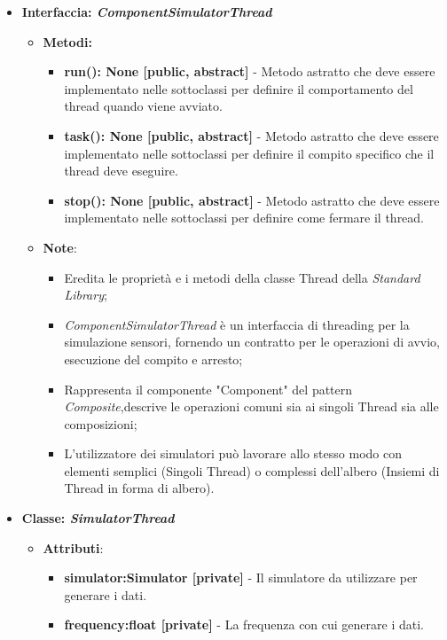 \begin{itemize}
\begin{itemize}
 \item{\textbf{Interfaccia: \textit{ComponentSimulatorThread}}}
    \begin{itemize}
        \item \textbf{Metodi: }
        \begin{itemize}
            \item \textbf{run(): None [public, abstract]} - Metodo astratto che deve essere implementato nelle sottoclassi per definire il comportamento del thread quando viene avviato.
            \item \textbf{task(): None [public, abstract]} - Metodo astratto che deve essere implementato nelle sottoclassi per definire il compito specifico che il thread deve eseguire.
            \item \textbf{stop(): None [public, abstract]} - Metodo astratto che deve essere implementato nelle sottoclassi per definire come fermare il thread.
        \end{itemize}
        \item\textbf{Note}:
            \begin{itemize}
                \item Eredita le proprietà e i metodi della classe Thread della \textit{Standard Library};
                \item \textit{ComponentSimulatorThread} è un interfaccia di threading per la simulazione sensori, fornendo un contratto per le operazioni di avvio, esecuzione del compito e arresto;
                \item Rappresenta il componente "Component" del pattern \textit{Composite},descrive le operazioni comuni sia ai singoli Thread sia alle composizioni;
                \item L'utilizzatore dei simulatori può lavorare allo stesso modo con elementi semplici (Singoli Thread) o complessi dell'albero (Insiemi di Thread in forma di albero).
            \end{itemize}
    \end{itemize}
    \item{\textbf{Classe: \textit{SimulatorThread}}}
    \begin{itemize}
    \item\textbf{Attributi}:
        \begin{itemize}
        \item \textbf{simulator:Simulator [private]} - Il simulatore da utilizzare per generare i dati.
        \item \textbf{frequency:float [private]} - La frequenza con cui generare i dati.

\end{itemize}
\end{itemize}
\end{itemize}
\end{itemize}
